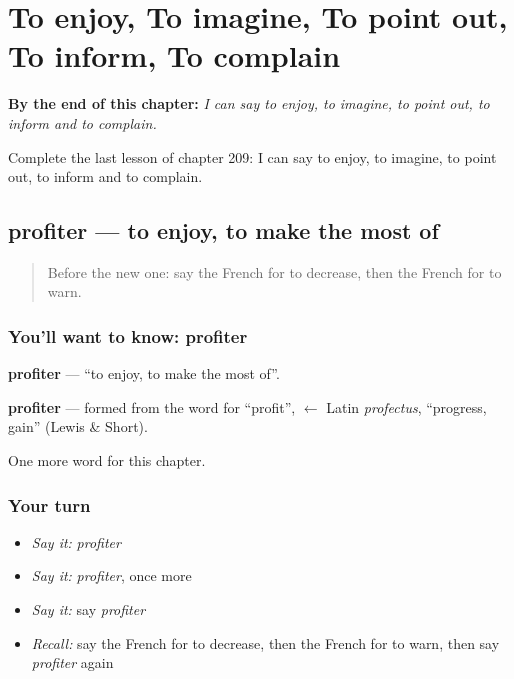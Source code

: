
\chapter{To enjoy, To imagine, To point out, To inform, To complain}
\label{ch:fr-to-enjoy-to-imagine-to-point-out-to-inform-to-complain}

\begin{chapteropening}
\textbf{By the end of this chapter:} \emph{I can say to enjoy, to imagine, to point out, to inform and to complain.}

Complete the last lesson of chapter 209: I can say to enjoy, to imagine, to point out, to inform and to complain.
\end{chapteropening}

\section[profiter]{profiter — to enjoy, to make the most of}

\label{lesson:FR-C209-profiter}



\begin{quote}
Before the new one: say the French for to decrease, then the French for to warn.
\end{quote}

\subsection*{You'll want to know: profiter}
\textbf{profiter} — \textquotedblleft{}to enjoy, to make the most of\textquotedblright{}.

\begin{cousinweb}
\textbf{profiter} — formed from the word for \textquotedblleft{}profit\textquotedblright{}, $\leftarrow$ Latin \emph{profectus}, \textquotedblleft{}progress, gain\textquotedblright{} (Lewis \& Short).
\end{cousinweb}

\begin{grammarlens}[title={What you've built}]
One more word for this chapter.
\end{grammarlens}

\subsection*{Your turn}
\begin{itemize}
\raggedright
  \item \emph{Say it:} \emph{profiter}
  \item \emph{Say it:} \emph{profiter}, once more
  \item \emph{Say it:} say \emph{profiter}
  \item \emph{Recall:} say the French for to decrease, then the French for to warn, then say \emph{profiter} again
\end{itemize}

